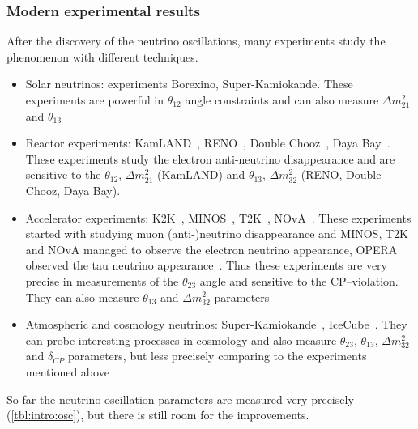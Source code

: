 \documentclass[../main.tex]{subfiles}
\begin{document}
\subsubsection{Modern experimental results}
After the discovery of the neutrino oscillations, many experiments study the phenomenon with different techniques.
\begin{itemize}
  \item Solar neutrinos: experiments Borexino, Super-Kamiokande. These experiments are powerful in $\theta_{12}$ angle constraints and can also measure $\Delta m_{21}^2$ and $\theta_{13}$
  \item Reactor experiments: KamLAND~\cite{Eguchi2003}, RENO~\cite{Ahn2012}, Double Chooz~\cite{Abe2014}, Daya Bay~\cite{An2014}. These experiments study the electron anti-neutrino disappearance and are sensitive to the  $\theta_{12}$, $\Delta m_{21}^2$ (KamLAND) and $\theta_{13}$, $\Delta m_{32}^2$ (RENO, Double Chooz, Daya Bay).
  \item Accelerator experiments: K2K~\cite{Ahn2006}, MINOS~\cite{Adamson2014}, T2K~\cite{Abe2020a}, NOvA~\cite{Acero2019}. These experiments started with studying muon (anti-)neutrino disappearance and MINOS, T2K and NOvA managed to observe the electron neutrino appearance, OPERA observed the tau neutrino appearance~\cite{Agafonova2014}. Thus these experiments are very precise in measurements of the $\theta_{23}$ angle and sensitive to the CP--violation. They can also measure $\theta_{13}$ and $\Delta m^2_{32}$ parameters
  \item Atmospheric and cosmology neutrinos: Super-Kamiokande~\cite{Jiang2019}, IceCube~\cite{Deyoung2005}. They can probe interesting processes in cosmology and also measure $\theta_{23}$, $\theta_{13}$, $\Delta m^2_{32}$ and $\delta_{CP}$ parameters, but less precisely comparing to the experiments mentioned above
\end{itemize}

So far the neutrino oscillation parameters are measured very precisely (\autoref{tbl:intro:osc}), but there is still room for the improvements.
\end{document}
